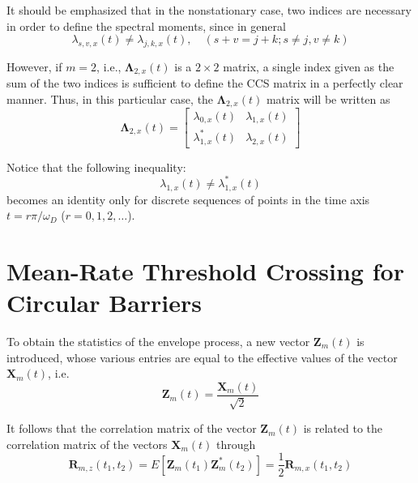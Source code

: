 \documentclass[11pt]{article}
\begin{document}
It should be emphasized that in the nonstationary case, two indices are necessary in order to define the spectral moments, since in general
\begin{equation}
\lambda_{s,v,x}(t) \neq \lambda_{j,k,x}(t), \quad (s + v = j + k; s \neq j, v \neq k)
\label{eq:nonstationary_inequality}
\end{equation}

However, if $m = 2$, i.e., $\boldsymbol{\Lambda}_{2,x}(t)$ is a $2 \times 2$ matrix, a single index given as the sum of the two indices is sufficient to define the CCS matrix in a perfectly clear manner. Thus, in this particular case, the $\boldsymbol{\Lambda}_{2,x}(t)$ matrix will be written as
\begin{equation}
\boldsymbol{\Lambda}_{2,x}(t) = \begin{bmatrix}
\lambda_{0,x}(t) & \lambda_{1,x}(t) \\
\lambda_{1,x}^*(t) & \lambda_{2,x}(t)
\end{bmatrix}
\label{eq:ccs_2x2}
\end{equation}

Notice that the following inequality:
\begin{equation}
\lambda_{1,x}(t) \neq \lambda_{1,x}^*(t)
\label{eq:lambda_inequality}
\end{equation}
becomes an identity only for discrete sequences of points in the time axis $t = r\pi/\omega_D$ ($r = 0, 1, 2, \ldots$).

\section{Mean-Rate Threshold Crossing for Circular Barriers}
\label{sec:threshold_crossing}

To obtain the statistics of the envelope process, a new vector $\mathbf{Z}_m(t)$ is introduced, whose various entries are equal to the effective values of the vector $\mathbf{X}_m(t)$, i.e.
\begin{equation}
\mathbf{Z}_m(t) = \frac{\mathbf{X}_m(t)}{\sqrt{2}}
\label{eq:effective_vector}
\end{equation}

It follows that the correlation matrix of the vector $\mathbf{Z}_m(t)$ is related to the correlation matrix of the vectors $\mathbf{X}_m(t)$ through
\begin{equation}
\mathbf{R}_{m,z}(t_1, t_2) = E[\mathbf{Z}_m(t_1)\mathbf{Z}_m^*(t_2)] = \frac{1}{2}\mathbf{R}_{m,x}(t_1, t_2)
\label{eq:correlation_z}
\end{equation}
\end{document}

